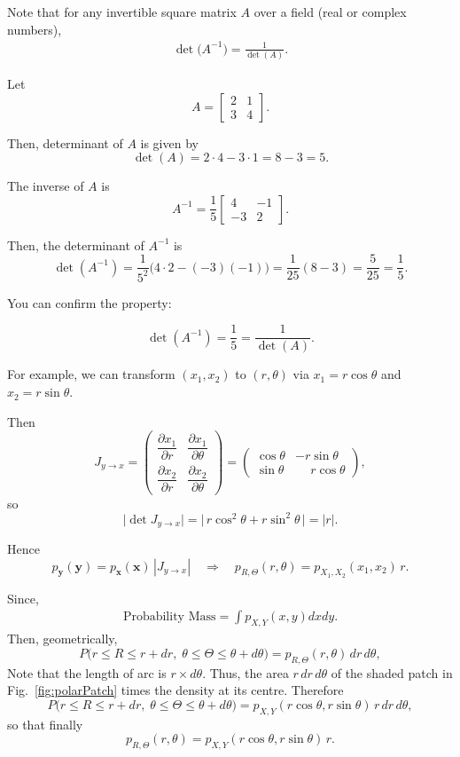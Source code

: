 Note that for any invertible square matrix $A$ over a field (\eg real or complex numbers),
\begin{align*}
	\det\bigl(A^{-1}\bigr)=\frac{1}{\det(A)}.
\end{align*}

Let
$$
A=\begin{bmatrix}
2 & 1\\[2pt]
3 & 4
\end{bmatrix}.
$$

Then, determinant of $A$ is given by
$$
\det(A)=2\cdot4-3\cdot1 = 8-3 = 5.
$$

The inverse of $A$ is 
$$
A^{-1}= \frac{1}{5}\begin{bmatrix}
4 & -1\\[2pt] -3 & 2
\end{bmatrix}.
$$

Then, the determinant of $A^{-1}$ is
$$
\det(A^{-1}) = \frac{1}{5^2}\bigl(4\cdot2-(-3)(-1)\bigr)
=\frac{1}{25}(8-3)=\frac{5}{25}=\frac{1}{5}.
$$

You can confirm the property:

$$
\det(A^{-1})=\frac{1}{5}=\frac{1}{\det(A)}.
$$


For example, we can transform $(x_1,x_2)$ to $(r,\theta)$ via $x_1=r\cos\theta$ and $x_2=r\sin\theta$.

Then
\[
J_{y\to x}=
\begin{pmatrix}
\dfrac{\partial x_1}{\partial r} & \dfrac{\partial x_1}{\partial\theta}\\[6pt]
\dfrac{\partial x_2}{\partial r} & \dfrac{\partial x_2}{\partial\theta}
\end{pmatrix}
=
\begin{pmatrix}
\cos\theta & -r\sin\theta\\
\sin\theta & \phantom{-}r\cos\theta
\end{pmatrix},
\tag{3}
\]
so
\[
\bigl|\det J_{y\to x}\bigr|
 = \bigl|\,r\cos^{2}\theta + r\sin^{2}\theta\,\bigr|
 = |r|.
\tag{4}
\]

Hence
\[
p_{\mathbf{y}}(\mathbf{y}) = p_{\mathbf{x}}(\mathbf{x})\,|J_{y\to x}|
\quad\Longrightarrow\quad
p_{R,\Theta}(r,\theta) = p_{X_1,X_2}(x_1,x_2)\,r.
\tag{5--6}
\]

Since, 
\begin{align*}
	\text{Probability Mass} = \int p_{X,Y}(x,y)dxdy.
\end{align*}
Then, geometrically,
\[
P\!\bigl(r\le R\le r+dr,\;
        \theta\le\Theta\le\theta+d\theta\bigr)
  = p_{R,\Theta}(r,\theta)\,dr\,d\theta,
\tag{7}
\]
Note that the length of arc is $r\times d\theta$. Thus, the area $r\,dr\,d\theta$ of the shaded patch in Fig.~\ref{fig:polarPatch} times the density at its centre.  Therefore
\[
P\!\bigl(r\le R\le r+dr,\;
        \theta\le\Theta\le\theta+d\theta\bigr)
  = p_{X,Y}(r\cos\theta, r\sin\theta)\,r\,dr\,d\theta,
\tag{8--9}
\]
so that finally
\[
p_{R,\Theta}(r,\theta)
  = p_{X,Y}(r\cos\theta, r\sin\theta)\,r.
\tag{10}
\]

